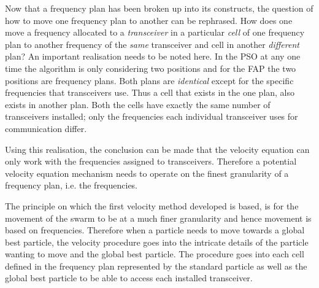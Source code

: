 Now that a frequency plan has been broken up into its constructs, the question of how to move one frequency plan to another can be rephrased. How does one move a frequency allocated to a \emph{transceiver} in a particular \emph{cell} of one frequency plan to another frequency of the \emph{same} transceiver and cell in another \emph{different} plan? An important realisation needs to be noted here. In the \gls{PSO} at any one time the algorithm is only considering two positions and for the \gls{FAP} the two positions are frequency plans. Both plans are \emph{identical} except for the specific frequencies that transceivers use. Thus a cell that exists in the one plan, also exists in another plan. Both the cells have exactly the same number of transceivers installed; only the frequencies each individual transceiver uses for communication differ.

Using this realisation, the conclusion can be made that the velocity equation can only work with the frequencies assigned to transceivers. Therefore a potential velocity equation mechanism needs to operate on the finest granularity of a frequency plan, i.e. the frequencies.

The principle on which the first velocity method developed is based, is for the movement of the swarm to be at a much finer granularity and hence movement is based on frequencies. Therefore when a particle needs to move towards a global best particle, the velocity procedure goes into the intricate details of the particle wanting to move and the global best particle. The procedure goes into each cell defined in the frequency plan represented by the standard particle as well as the global best particle to be able to access each installed transceiver.

